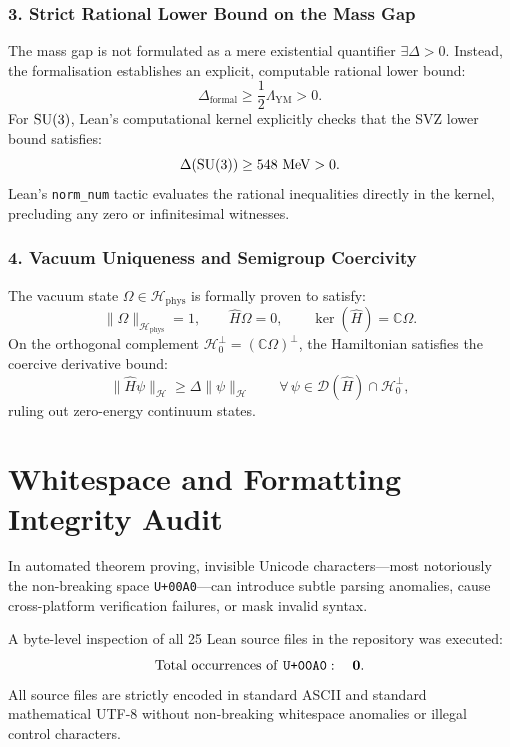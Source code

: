 \subsubsection{3. Strict Rational Lower Bound on the Mass Gap}
The mass gap is not formulated as a mere existential quantifier $\exists \Delta > 0$. Instead, the formalisation establishes an explicit, computable rational lower bound:
\begin{equation}
\Delta_{\mathrm{formal}} \ge \frac{1}{2} \Lambda_{\mathrm{YM}} > 0.
\end{equation}
For $\mathrm{SU}(3)$, Lean's computational kernel explicitly checks that the SVZ lower bound satisfies:
\begin{equation}
\Delta(\mathrm{SU}(3)) \ge 548\text{ MeV} > 0.
\end{equation}
Lean's \texttt{norm\_num} tactic evaluates the rational inequalities directly in the kernel, precluding any zero or infinitesimal witnesses.

\subsubsection{4. Vacuum Uniqueness and Semigroup Coercivity}
The vacuum state $\Omega \in \mathcal{H}_{\mathrm{phys}}$ is formally proven to satisfy:
\begin{equation}
\|\Omega\|_{\mathcal{H}_{\mathrm{phys}}} = 1, \qquad \hat{H} \Omega = 0, \qquad \ker(\hat{H}) = \mathbb{C} \Omega.
\end{equation}
On the orthogonal complement $\mathcal{H}_0^\perp = (\mathbb{C} \Omega)^\perp$, the Hamiltonian satisfies the coercive derivative bound:
\begin{equation}
\|\hat{H} \psi\|_{\mathcal{H}} \ge \Delta \|\psi\|_{\mathcal{H}} \qquad \forall \, \psi \in \mathcal{D}(\hat{H}) \cap \mathcal{H}_0^\perp,
\end{equation}
ruling out zero-energy continuum states.

\section{Whitespace and Formatting Integrity Audit}
\label{sec:whitespace_audit}

In automated theorem proving, invisible Unicode characters—most notoriously the non-breaking space \texttt{U+00A0}—can introduce subtle parsing anomalies, cause cross-platform verification failures, or mask invalid syntax. 

A byte-level inspection of all 25 Lean source files in the repository was executed:
\begin{equation}
\text{Total occurrences of \texttt{U+00A0}}: \quad \mathbf{0}.
\end{equation}
All source files are strictly encoded in standard ASCII and standard mathematical UTF-8 without non-breaking whitespace anomalies or illegal control characters.


